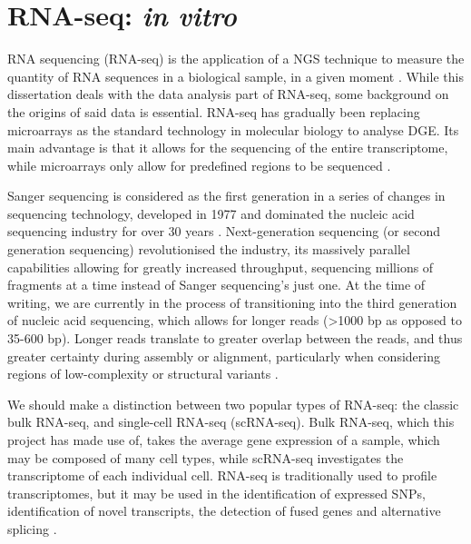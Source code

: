 \section{RNA-seq: \textit{in vitro}}
RNA sequencing (RNA-seq) is the application of a \ac{NGS} technique to measure the quantity of RNA sequences in a biological sample, in a given moment \citep{zhong2009}. While this dissertation deals with the data analysis part of RNA-seq, some background on the origins of said data is essential. RNA-seq has gradually been replacing microarrays as the standard technology in molecular biology to analyse \ac{DGE}. Its main advantage is that it allows for the sequencing of the entire transcriptome, while microarrays only allow for predefined regions to be sequenced \citep{rao2019comparison}. 

Sanger sequencing is considered as the first generation in a series of changes in sequencing technology, developed in 1977 and dominated the nucleic acid sequencing industry for over 30 years \citep{behjati2013next}. Next-generation sequencing (or second generation sequencing) revolutionised the industry, its massively parallel capabilities allowing for greatly increased throughput, sequencing millions of fragments at a time instead of Sanger sequencing's just one. At the time of writing, we are currently in the process of transitioning into the third generation of nucleic acid sequencing, which allows for longer reads (>1000 bp as opposed to 35-600 bp). Longer reads translate to greater overlap between the reads, and thus greater certainty during assembly or alignment, particularly when considering regions of low-complexity or structural variants \citep{rhoads2015pacbio}. 

We should make a distinction between two popular types of RNA-seq: the classic bulk RNA-seq, and single-cell RNA-seq (scRNA-seq). Bulk RNA-seq, which this project has made use of, takes the average gene expression of a sample, which may be composed of many cell types, while scRNA-seq investigates the transcriptome of each individual cell. RNA-seq is traditionally used to profile transcriptomes, but it may be used in the identification of expressed SNPs, identification of novel transcripts, the detection of fused genes and alternative splicing \citep{han2015alternative, zhao2014comparison}. 



